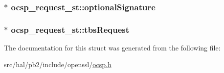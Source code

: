 \subsubsection[{\texorpdfstring{optional\+Signature}{optionalSignature}}]{$\ast$ ocsp\+\_\+request\+\_\+st\+::optional\+Signature}\hypertarget{structocsp__request__st_a97762bfa4b2c09c1811bfe21882fce5a}{}\label{structocsp__request__st_a97762bfa4b2c09c1811bfe21882fce5a}
\subsubsection[{\texorpdfstring{tbs\+Request}{tbsRequest}}]{$\ast$ ocsp\+\_\+request\+\_\+st\+::tbs\+Request}\hypertarget{structocsp__request__st_a743dcc34d9ff06fe9635118c0a0030c0}{}\label{structocsp__request__st_a743dcc34d9ff06fe9635118c0a0030c0}


The documentation for this struct was generated from the following file\+:\begin{DoxyCompactItemize}
\item 
src/hal/pb2/include/openssl/\hyperlink{ocsp_8h}{ocsp.\+h}\end{DoxyCompactItemize}
